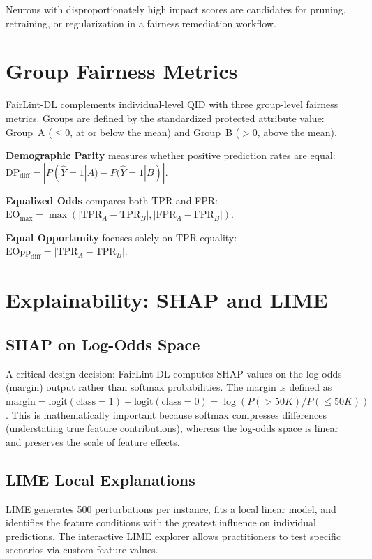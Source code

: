 Neurons with disproportionately high impact scores are candidates for pruning, retraining, or regularization in a fairness remediation workflow.

\section{Group Fairness Metrics}

FairLint-DL complements individual-level QID with three group-level fairness metrics. Groups are defined by the standardized protected attribute value: Group~A ($\leq 0$, at or below the mean) and Group~B ($> 0$, above the mean).

\textbf{Demographic Parity} measures whether positive prediction rates are equal: $\text{DP}_{\text{diff}} = |P(\hat{Y}=1 | A) - P(\hat{Y}=1 | B)|$.

\textbf{Equalized Odds} compares both TPR and FPR: $\text{EO}_{\max} = \max(|\text{TPR}_A - \text{TPR}_B|, |\text{FPR}_A - \text{FPR}_B|)$.

\textbf{Equal Opportunity} focuses solely on TPR equality: $\text{EOpp}_{\text{diff}} = |\text{TPR}_A - \text{TPR}_B|$.

\section{Explainability: SHAP and LIME}

\subsection{SHAP on Log-Odds Space}

A critical design decision: FairLint-DL computes SHAP values on the log-odds (margin) output rather than softmax probabilities. The margin is defined as $\text{margin} = \text{logit}(\text{class}=1) - \text{logit}(\text{class}=0) = \log(P(>50K) / P(\leq 50K))$. This is mathematically important because softmax compresses differences (understating true feature contributions), whereas the log-odds space is linear and preserves the scale of feature effects.

\subsection{LIME Local Explanations}

LIME generates 500 perturbations per instance, fits a local linear model, and identifies the feature conditions with the greatest influence on individual predictions. The interactive LIME explorer allows practitioners to test specific scenarios via custom feature values.

